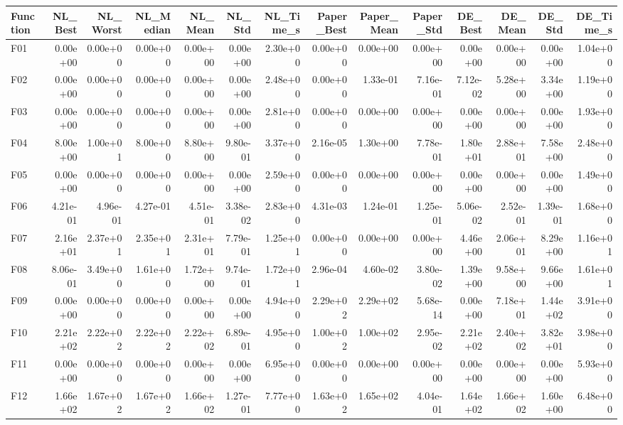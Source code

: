 \begin{tabular}{lrrrrrrrrrrrrr}
\toprule
Function & NL_Best & NL_Worst & NL_Median & NL_Mean & NL_Std & NL_Time_s & Paper_Best & Paper_Mean & Paper_Std & DE_Best & DE_Mean & DE_Std & DE_Time_s \\
\midrule
F01 & 0.00e+00 & 0.00e+00 & 0.00e+00 & 0.00e+00 & 0.00e+00 & 2.30e+00 & 0.00e+00 & 0.00e+00 & 0.00e+00 & 0.00e+00 & 0.00e+00 & 0.00e+00 & 1.04e+00 \\
F02 & 0.00e+00 & 0.00e+00 & 0.00e+00 & 0.00e+00 & 0.00e+00 & 2.48e+00 & 0.00e+00 & 1.33e-01 & 7.16e-01 & 7.12e-02 & 5.28e+00 & 3.34e+00 & 1.19e+00 \\
F03 & 0.00e+00 & 0.00e+00 & 0.00e+00 & 0.00e+00 & 0.00e+00 & 2.81e+00 & 0.00e+00 & 0.00e+00 & 0.00e+00 & 0.00e+00 & 0.00e+00 & 0.00e+00 & 1.93e+00 \\
F04 & 8.00e+00 & 1.00e+01 & 8.00e+00 & 8.80e+00 & 9.80e-01 & 3.37e+00 & 2.16e-05 & 1.30e+00 & 7.78e-01 & 1.80e+01 & 2.88e+01 & 7.58e+00 & 2.48e+00 \\
F05 & 0.00e+00 & 0.00e+00 & 0.00e+00 & 0.00e+00 & 0.00e+00 & 2.59e+00 & 0.00e+00 & 0.00e+00 & 0.00e+00 & 0.00e+00 & 0.00e+00 & 0.00e+00 & 1.49e+00 \\
F06 & 4.21e-01 & 4.96e-01 & 4.27e-01 & 4.51e-01 & 3.38e-02 & 2.83e+00 & 4.31e-03 & 1.24e-01 & 1.25e-01 & 5.06e-02 & 2.52e-01 & 1.39e-01 & 1.68e+00 \\
F07 & 2.16e+01 & 2.37e+01 & 2.35e+01 & 2.31e+01 & 7.79e-01 & 1.25e+01 & 0.00e+00 & 0.00e+00 & 0.00e+00 & 4.46e+00 & 2.06e+01 & 8.29e+00 & 1.16e+01 \\
F08 & 8.06e-01 & 3.49e+00 & 1.61e+00 & 1.72e+00 & 9.74e-01 & 1.72e+01 & 2.96e-04 & 4.60e-02 & 3.80e-02 & 1.39e+00 & 9.58e+00 & 9.66e+00 & 1.61e+01 \\
F09 & 0.00e+00 & 0.00e+00 & 0.00e+00 & 0.00e+00 & 0.00e+00 & 4.94e+00 & 2.29e+02 & 2.29e+02 & 5.68e-14 & 0.00e+00 & 7.18e+01 & 1.44e+02 & 3.91e+00 \\
F10 & 2.21e+02 & 2.22e+02 & 2.22e+02 & 2.22e+02 & 6.89e-01 & 4.95e+00 & 1.00e+02 & 1.00e+02 & 2.95e-02 & 2.21e+02 & 2.40e+02 & 3.82e+01 & 3.98e+00 \\
F11 & 0.00e+00 & 0.00e+00 & 0.00e+00 & 0.00e+00 & 0.00e+00 & 6.95e+00 & 0.00e+00 & 0.00e+00 & 0.00e+00 & 0.00e+00 & 0.00e+00 & 0.00e+00 & 5.93e+00 \\
F12 & 1.66e+02 & 1.67e+02 & 1.67e+02 & 1.66e+02 & 1.27e-01 & 7.77e+00 & 1.63e+02 & 1.65e+02 & 4.04e-01 & 1.64e+02 & 1.66e+02 & 1.60e+00 & 6.48e+00 \\
\bottomrule
\end{tabular}
